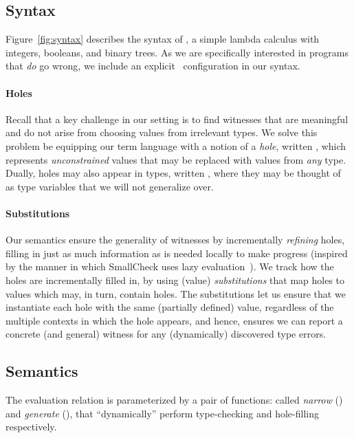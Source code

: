 \subsection{Syntax}
\label{sec:syntax}

%
Figure~\ref{fig:syntax} describes the syntax of \lang, a simple lambda
calculus with integers, booleans, and binary trees.
%
As we are specifically interested in programs that \emph{do} go wrong,
we include an explicit \stuck\ configuration in our syntax.

\paragraph{Holes}
\label{sec:holes}
%
Recall that a key challenge in our setting is to find witnesses
that are meaningful and do not arise from choosing values from
irrelevant types.
%
We solve this problem be equipping our term language with a notion
of a \emph{hole}, written \ehole, which represents \emph{unconstrained}
values that may be replaced with values from \emph{any} type.
%
Dually, holes may also appear in types, written \thole, where they may
be thought of as type variables that we will not generalize over.
%

\paragraph{Substitutions}
%
Our semantics ensure the generality of witnesses by incrementally
\emph{refining} holes, filling in just as much information as is
needed locally to make progress (inspired by the manner in
which SmallCheck uses lazy evaluation~\cite{runciman_smallcheck_2008}).
%
We track how the holes are incrementally filled in, by using
(value) \emph{substitutions} that map holes %
to values which may, in turn, contain holes.
%
The substitutions let us ensure that we instantiate each hole
with the same (partially defined) value, regardless of the multiple
contexts in which the hole appears, and hence, ensures we can
report a concrete (and general) witness for any (dynamically)
discovered type errors.

\subsection{Semantics}
\label{sec:semantics}
%

The evaluation relation is parameterized by a pair of functions:
called \emph{narrow} (\forcesym) and \emph{generate} (\gensym),
that ``dynamically'' perform type-checking and hole-filling
respectively.

